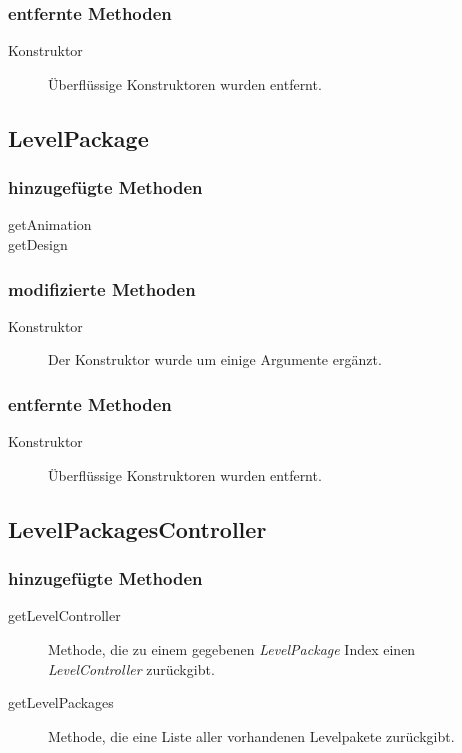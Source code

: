 	\subsubsection{entfernte Methoden}
		\begin{description}
			\item[Konstruktor] Überflüssige Konstruktoren wurden entfernt.
		\end{description}


\subsection{LevelPackage}

	\subsubsection{hinzugefügte Methoden}
		\begin{description}
			\item[getAnimation]
			\item[getDesign]
		\end{description}
	\subsubsection{modifizierte Methoden}
		\begin{description}
			\item[Konstruktor] Der Konstruktor wurde um einige Argumente ergänzt.
		\end{description}
	\subsubsection{entfernte Methoden}
		\begin{description}
			\item[Konstruktor] Überflüssige Konstruktoren wurden entfernt.
		\end{description}



\subsection{LevelPackagesController}

	\subsubsection{hinzugefügte Methoden}
		\begin{description}
			\item[getLevelController] Methode, die zu einem gegebenen \emph{LevelPackage} Index einen
			 \emph{LevelController} zurückgibt. 
			\item[getLevelPackages] Methode, die eine Liste aller vorhandenen Levelpakete zurückgibt.
		\end{description}


